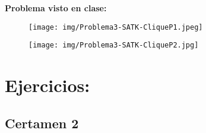 \documentclass{templateNote}
\begin{document}
\begin{itemize}
    \textbf{Problema visto en clase:}
    \begin{figure}[H]
        \centering
        \texttt{[image: img/Problema3-SATK-CliqueP1.jpeg]}
    \end{figure}
    \begin{figure}[H]
        \centering
        \texttt{[image: img/Problema3-SATK-CliqueP2.jpg]}
    \end{figure}

\end{itemize}

\section{Ejercicios:}
\subsection*{Certamen 2}
\end{document}
